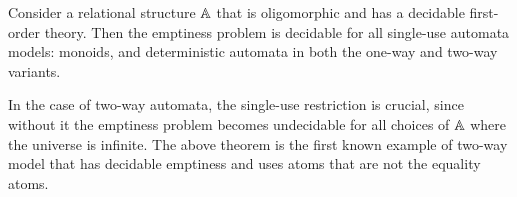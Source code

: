 

\begin{theorem}\label{thm:single-use-automata-relational-structures}
    Consider a relational structure $\mathbb A$ that is oligomorphic and has a decidable first-order theory. Then the emptiness problem is decidable for all single-use automata models: monoids, and deterministic automata in both the one-way and two-way variants.
\end{theorem}

In the case of two-way automata, the single-use restriction is crucial, since without it the emptiness problem becomes undecidable for all choices of $\mathbb A$ where the universe is infinite. The above theorem is the first known example of two-way model that has decidable emptiness and uses atoms that are not the equality atoms. 

